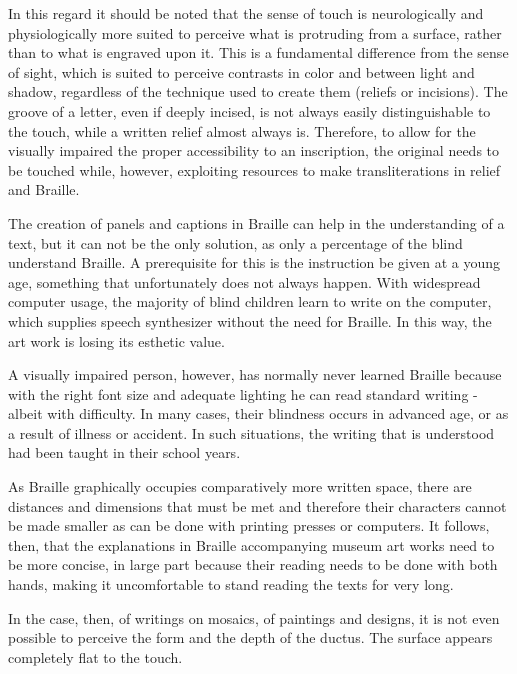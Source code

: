 \documentclass[amsthm,ebook]{saparticle}
\begin{document}
In this regard it should be noted that the sense of touch is neurologically and physiologically more suited to perceive
what is protruding from a surface, rather than to what is engraved upon it. This is a fundamental difference from the
sense of sight, which is suited to perceive contrasts in color and between light and shadow, regardless of the
technique used to create them (reliefs or incisions). The groove of a letter, even if deeply incised, is not always
easily distinguishable to the touch, while a written relief almost always is. Therefore, to allow for the visually
impaired the proper accessibility to an inscription, the original needs to be touched while, however, exploiting
resources to make transliterations in relief and Braille.

The creation of panels and captions in Braille can help in the understanding of a text, but it can not be the only
solution, as only a percentage of the blind understand Braille. A prerequisite for this is the instruction be given at
a young age, something that unfortunately does not always happen. With widespread computer usage, the majority of blind
children learn to write on the computer, which supplies speech synthesizer without the need for Braille. In this way,
the art work is losing its esthetic value.

A visually impaired person, however, has normally never learned Braille because with the right font size and adequate
lighting he can read standard writing - albeit with difficulty. In many cases, their blindness occurs in advanced age,
or as a result of illness or accident. In such situations, the writing that is understood had been taught in their
school years.

As Braille graphically occupies comparatively more written space, there are distances and dimensions that must be met
and therefore their characters cannot be made smaller as can be done with printing presses or computers. It follows,
then, that the explanations in Braille accompanying museum art works need to be more concise, in large part because
their reading needs to be done with both hands, making it uncomfortable to stand reading the texts for very long.

In the case, then, of writings on mosaics, of paintings and designs, it is not even possible to perceive the form and
the depth of the ductus. The surface appears completely flat to the touch.
\end{document}
